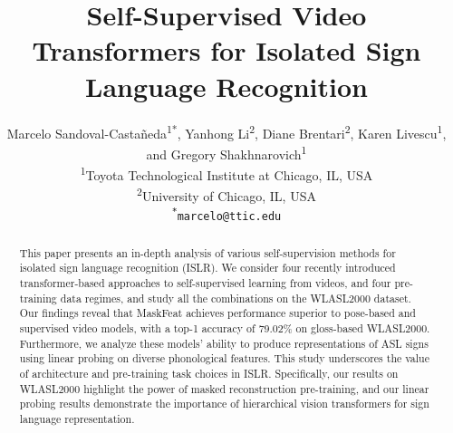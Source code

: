 \documentclass[10pt,twocolumn,letterpaper]{article}
\newcommand*{\affaddr}[1]{#1} %
\newcommand*{\affmark}[1][*]{\textsuperscript{#1}}
\newcommand*{\email}[1]{\texttt{#1}}
\begin{document}
\title{Self-Supervised Video Transformers for Isolated Sign Language Recognition}

\author{%
Marcelo Sandoval-Casta\~neda\affmark[1]\affmark[*], Yanhong Li\affmark[2], Diane Brentari\affmark[2], Karen Livescu\affmark[1], and Gregory Shakhnarovich\affmark[1]\\
\affaddr{\affmark[1]Toyota Technological Institute at Chicago, IL, USA}\\
\affaddr{\affmark[2]University of Chicago, IL, USA}\\
\email{\affmark[*]marcelo@ttic.edu}\\
}



\maketitle

\begin{abstract}
   This paper presents an in-depth analysis of various self-supervision methods for isolated sign language recognition (ISLR). We consider four recently introduced transformer-based approaches to self-supervised learning from videos, and four pre-training data regimes, and study all the combinations on the WLASL2000 dataset.
   Our findings reveal that MaskFeat achieves performance superior to pose-based and supervised video models, with a top-1 accuracy of 79.02\% on gloss-based WLASL2000. Furthermore, we analyze these models' ability to produce representations of ASL signs using linear probing on diverse phonological features. This study underscores the value of architecture and pre-training task choices in ISLR. Specifically, our results on WLASL2000 highlight the power of masked reconstruction pre-training, and our linear probing results demonstrate the importance of hierarchical vision transformers for sign language representation.
\end{abstract}














%

{\small


}

\clearpage

\appendix

\end{document}
